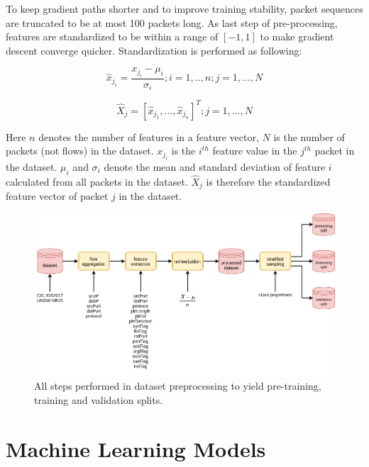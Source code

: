 To keep gradient paths shorter and to improve training stability, packet sequences are truncated to be at most 100 packets long. As last step of pre-processing, features are standardized to be within a range of $[-1,1]$ to make gradient descent converge quicker. Standardization is performed as following: \par

\begin{equation}
	\hat{x}_{j_i} = \frac{x_{j_i} - \mu_{i}}{\sigma_{i}}; i=1, .., n; j=1, ..., N
\end{equation}

\begin{equation}
	\hat{X}_j = [\hat{x}_{j_1}, ..., \hat{x}_{j_n}]^T; j=1, ..., N
\end{equation}

Here $n$ denotes the number of features in a feature vector, $N$ is the number of packets (not flows) in the dataset. $x_{j_i}$ is the $i^{th}$ feature value in the $j^{th}$ packet in the dataset. $\mu_{i}$ and $\sigma_{i}$ denote the mean and standard deviation of feature $i$ calculated from all packets in the dataset. $\hat{X}_j$ is therefore the standardized feature vector of packet $j$ in the dataset.


\begin{figure}[h]
	\centering
	\includegraphics[width=0.95\linewidth]{graphics/img/dataset_preprocessing.png}
	\caption{All steps performed in dataset preprocessing to yield pre-training, training and validation splits.}
	\label{fig:dataset_preprocessing}
\end{figure}

\section{Machine Learning Models}

